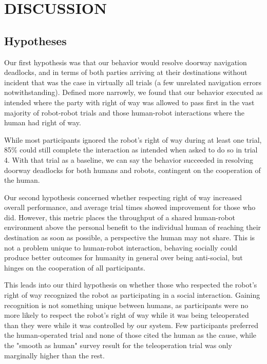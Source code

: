 \documentclass[letterpaper, 10 pt, conference]{ieeeconf}  %
\begin{document}
\section{DISCUSSION}

\subsection{Hypotheses}

Our first hypothesis was that our behavior would resolve doorway navigation deadlocks, and in terms of both parties arriving at their destinations without incident that was the case in virtually all trials (a few unrelated navigation errors notwithstanding). Defined more narrowly, we found that our behavior executed as intended where the party with right of way was allowed to pass first in the vast majority of robot-robot trials and those human-robot interactions where the human had right of way. 

While most participants ignored the robot's right of way during at least one trial, 85\% could still complete the interaction as intended when asked to do so in trial 4. With that trial as a baseline, we can say the behavior succeeded in resolving doorway deadlocks for both humans and robots, contingent on the cooperation of the human.

Our second hypothesis concerned whether respecting right of way increased overall performance, and average trial times showed  improvement for those who did. However, this metric places the throughput of a shared human-robot environment above the personal benefit to the individual human of reaching their destination as soon as possible, a perspective the human may not share. This is not a problem unique to human-robot interaction, behaving socially could produce better outcomes for humanity in general over being anti-social, but hinges on the cooperation of all participants.

This leads into our third hypothesis on whether those who respected the robot's right of way recognized the robot as participating in a social interaction. Gaining recognition is not something unique between humans, as participants were no more likely to respect the robot's right of way while it was being teleoperated than they were while it was controlled by our system. Few participants preferred the human-operated trial and none of those cited the human as the cause, while the "smooth as human" survey result for the teleoperation trial was only marginally higher than the rest.
\end{document}
